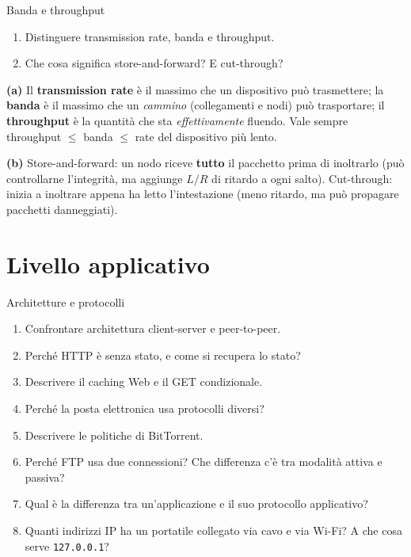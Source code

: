 \begin{esercizio}{Banda e throughput}
\begin{enumerate}[label=(\alph*)]
    \item Distinguere transmission rate, banda e throughput.
    \item Che cosa significa store-and-forward? E cut-through?
\end{enumerate}
\end{esercizio}

\svolgimento
\textbf{(a)} Il \textbf{transmission rate} è il massimo che un dispositivo può trasmettere; la \textbf{banda} è il massimo che un
\emph{cammino} (collegamenti e nodi) può trasportare; il \textbf{throughput} è la quantità che sta \emph{effettivamente} fluendo.
Vale sempre throughput $\le$ banda $\le$ rate del dispositivo più lento.

\textbf{(b)} Store-and-forward: un nodo riceve \textbf{tutto} il pacchetto prima di inoltrarlo (può controllarne l'integrità, ma
aggiunge $L/R$ di ritardo a ogni salto). Cut-through: inizia a inoltrare appena ha letto l'intestazione (meno ritardo, ma può propagare
pacchetti danneggiati).

\section{Livello applicativo}

\begin{esercizio}{Architetture e protocolli}
\begin{enumerate}[label=(\alph*)]
    \item Confrontare architettura client-server e peer-to-peer.
    \item Perché HTTP è senza stato, e come si recupera lo stato?
    \item Descrivere il caching Web e il GET condizionale.
    \item Perché la posta elettronica usa protocolli diversi?
    \item Descrivere le politiche di BitTorrent.
    \item Perché FTP usa due connessioni? Che differenza c'è tra modalità attiva e passiva?
    \item Qual è la differenza tra un'applicazione e il suo protocollo applicativo?
    \item Quanti indirizzi IP ha un portatile collegato via cavo e via Wi-Fi? A che cosa serve \texttt{127.0.0.1}?
\end{enumerate}
\end{esercizio}

